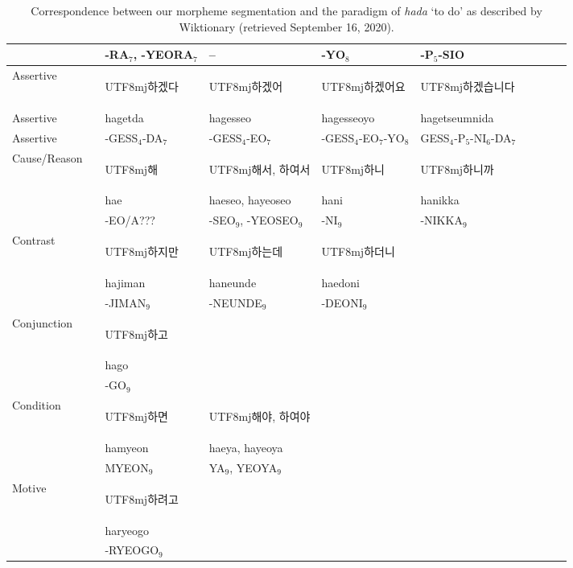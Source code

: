 \documentclass[11pt,letterpaper]{article}
\newcommand{\korean}[1]{\begin{CJK}{UTF8}{mj}#1\end{CJK}}
\begin{document}
\begin{table}
\begin{tabular}{llllllllll}
  && -RA$_7$, -YEORA$_7$ &-- & -YO$_8$ & -P$_5$-SIO \\ \hline
Assertive   && \korean{하겠다}  & \korean{하겠어}  & \korean{하겠어요}  & \korean{하겠습니다}  \\
Assertive   &&  hagetda & hagesseo &  hagesseoyo & hagetseumnida \\
Assertive   &&  -GESS$_4$-DA$_7$ & -GESS$_4$-EO$_7$ &  -GESS$_4$-EO$_7$-YO$_8$ & GESS$_4$-P$_5$-NI$_6$-DA$_7$ \\ \hline
Cause/Reason && \korean{해} & \korean{해서, 하여서} & \korean{하니} & \korean{하니까} \\
&& hae & haeseo, hayeoseo & hani & hanikka \\ 
&& -EO/A??? & -SEO$_9$, -YEOSEO$_9$ & -NI$_9$ & -NIKKA$_9$ \\ \hline
Contrast && \korean{하지만} & \korean{하는데} & \korean{하더니} \\
 && hajiman & haneunde & haedoni & \\ 
 && -JIMAN$_9$ & -NEUNDE$_9$ & -DEONI$_9$ & \\ \hline
Conjunction && \korean{하고} \\
 && hago \\ 
&& -GO$_9$ \\ \hline
Condition && \korean{하면} & \korean{해야, 하여야} \\
&& hamyeon & haeya, hayeoya \\
&& MYEON$_9$ & YA$_9$, YEOYA$_9$ \\ \hline
Motive && \korean{하려고} \\
 && haryeogo \\
&& -RYEOGO$_9$
\end{tabular}
	\caption{Correspondence between our morpheme segmentation and the paradigm of \textit{hada} `to do' as described by Wiktionary (retrieved September 16, 2020).}\label{tab:korean-hada}
\end{table}
\end{document}
